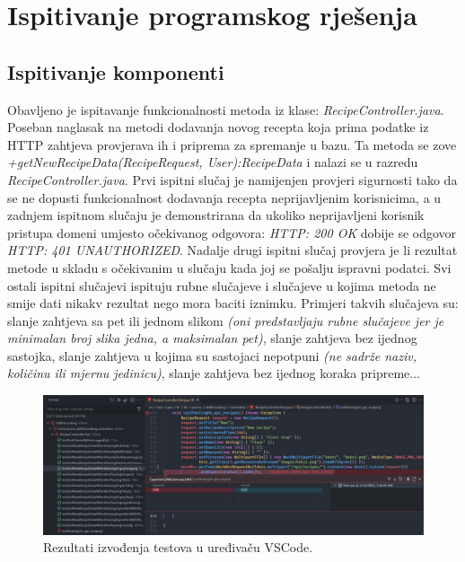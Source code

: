 \eject


\section{Ispitivanje programskog rješenja}


\subsection{Ispitivanje komponenti}
Obavljeno je ispitavanje funkcionalnosti metoda iz klase: \textit{RecipeController.java}.
Poseban naglasak na metodi dodavanja novog recepta koja prima podatke
iz HTTP zahtjeva provjerava ih i priprema za spremanje u bazu.
Ta metoda se zove \linebreak\textit{+getNewRecipeData(RecipeRequest, User):RecipeData}
i nalazi se u razredu \textit{RecipeController.java}. Prvi ispitni slučaj je namijenjen provjeri sigurnosti
tako da se ne dopusti funkcionalnost dodavanja recepta neprijavljenim korisnicima, a u zadnjem ispitnom slučaju
je demonstrirana da ukoliko neprijavljeni korisnik pristupa domeni umjesto očekivanog odgovora: \textit{HTTP: 200 OK}
dobije se odgovor \textit{HTTP: 401 UNAUTHORIZED}. Nadalje drugi ispitni slučaj provjera je li rezultat metode
u skladu s očekivanim u slučaju kada joj se pošalju ispravni podatci. Svi ostali ispitni slučajevi ispituju rubne slučajeve i
slučajeve u kojima metoda ne smije dati nikakv rezultat nego mora baciti iznimku. Primjeri takvih slučajeva su:
slanje zahtjeva sa pet ili jednom slikom \textit{(oni predstavljaju rubne slučajeve jer je minimalan broj slika jedna, a maksimalan pet)},
slanje zahtjeva bez ijednog sastojka, slanje zahtjeva u kojima su sastojaci nepotpuni
\textit{(ne sadrže naziv, količinu ili mjernu jedinicu)}, slanje zahtjeva bez ijednog koraka pripreme...

\begin{figure}[H]
	\includegraphics[scale=0.4]{slike/tests.jpg} %
	\centering
	\caption{Rezultati izvođenja testova u uređivaču VSCode.}
	\label{fig:promjene}
\end{figure}


